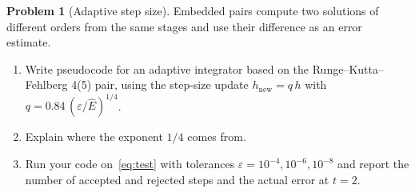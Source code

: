 \documentclass[11pt]{article}
\theoremstyle{definition}
\newtheorem{problem}{Problem}
\begin{document}
\begin{problem}[Adaptive step size]\label{prob:adaptive}
Embedded pairs compute two solutions of different orders from the same stages and use their difference as an error estimate.
\begin{enumerate}[label=(\alph*)]
  \item Write pseudocode for an adaptive integrator based on the Runge--Kutta--Fehlberg 4(5) pair, using the step-size update $h_{\text{new}} = q\,h$ with $q = 0.84\,(\varepsilon/\hat{E})^{1/4}$.
  \item Explain where the exponent $1/4$ comes from.
  \item Run your code on~\eqref{eq:test} with tolerances $\varepsilon = 10^{-4}, 10^{-6}, 10^{-8}$ and report the number of accepted and rejected steps and the actual error at $t = 2$.
\end{enumerate}
\end{problem}
\end{document}
